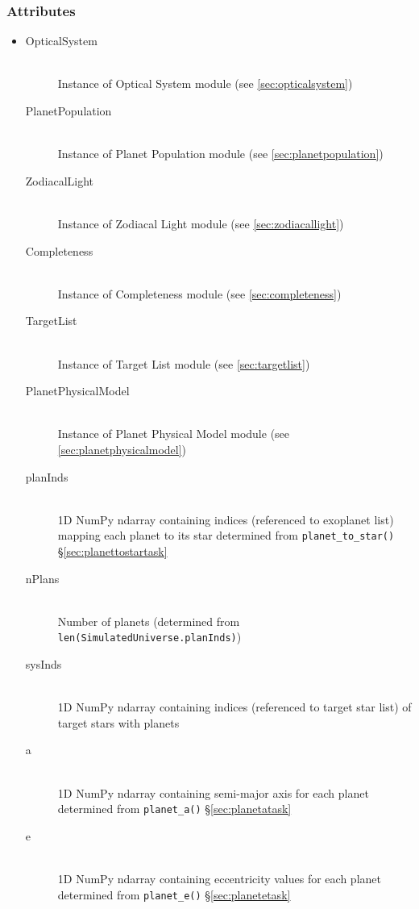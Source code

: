 \documentclass[cleanfoot]{asme2ej}
\begin{document}
\subsubsection*{Attributes}
\begin{itemize}
    \item
    \begin{description}
        \item[OpticalSystem] \hfill \\
        Instance of Optical System module (see \ref{sec:opticalsystem})
        \item[PlanetPopulation] \hfill \\
        Instance of Planet Population module (see \ref{sec:planetpopulation})
        \item[ZodiacalLight] \hfill \\
        Instance of Zodiacal Light module (see \ref{sec:zodiacallight})
        \item[Completeness] \hfill \\
        Instance of Completeness module (see \ref{sec:completeness})
        \item[TargetList] \hfill \\
        Instance of Target List module (see \ref{sec:targetlist})
        \item[PlanetPhysicalModel] \hfill \\
        Instance of Planet Physical Model module (see \ref{sec:planetphysicalmodel})
        \item[planInds] \hfill \\
        1D NumPy ndarray containing indices (referenced to exoplanet list) mapping each planet to its star determined from \verb+planet_to_star()+ \S\ref{sec:planettostartask}
        \item[nPlans] \hfill \\
        Number of planets (determined from \verb+len(SimulatedUniverse.planInds)+)
        \item[sysInds] \hfill \\
        1D NumPy ndarray containing indices (referenced to target star list) of target stars with planets
        \item[a] \hfill \\
        1D NumPy ndarray containing semi-major axis for each planet determined from \verb+planet_a()+ \S\ref{sec:planetatask}
        \item[e] \hfill \\
        1D NumPy ndarray containing eccentricity values for each planet determined from \verb+planet_e()+ \S\ref{sec:planetetask}

\end{description}
\end{itemize}
\end{document}
